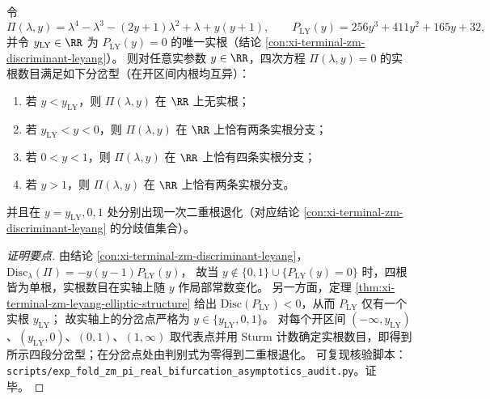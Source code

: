 \begin{conclusion}\label{con:xi-terminal-zm-pi-real-root-bifurcation}
令
\[
\Pi(\lambda,y)=\lambda^4-\lambda^3-(2y+1)\lambda^2+\lambda+y(y+1),
\qquad
P_{\mathrm{LY}}(y)=256y^3+411y^2+165y+32,
\]
并令 \(y_{\mathrm{LY}}\in\RR\) 为 \(P_{\mathrm{LY}}(y)=0\) 的唯一实根（结论 \ref{con:xi-terminal-zm-discriminant-leyang}）。
则对任意实参数 \(y\in\RR\)，四次方程 \(\Pi(\lambda,y)=0\) 的实根数目满足如下分岔型（在开区间内根均互异）：
\begin{enumerate}
  \item 若 \(y<y_{\mathrm{LY}}\)，则 \(\Pi(\lambda,y)\) 在 \(\RR\) 上无实根；
  \item 若 \(y_{\mathrm{LY}}<y<0\)，则 \(\Pi(\lambda,y)\) 在 \(\RR\) 上恰有两条实根分支；
  \item 若 \(0<y<1\)，则 \(\Pi(\lambda,y)\) 在 \(\RR\) 上恰有四条实根分支；
  \item 若 \(y>1\)，则 \(\Pi(\lambda,y)\) 在 \(\RR\) 上恰有两条实根分支。
\end{enumerate}
并且在 \(y=y_{\mathrm{LY}},0,1\) 处分别出现一次二重根退化（对应结论 \ref{con:xi-terminal-zm-discriminant-leyang} 的分歧值集合）。
\end{conclusion}
\begin{proof}[证明要点]
由结论 \ref{con:xi-terminal-zm-discriminant-leyang}，
\(\mathrm{Disc}_{\lambda}(\Pi)=-y(y-1)P_{\mathrm{LY}}(y)\)，
故当 \(y\notin\{0,1\}\cup\{P_{\mathrm{LY}}(y)=0\}\) 时，四根皆为单根，实根数目在实轴上随 \(y\) 作局部常数变化。
另一方面，定理 \ref{thm:xi-terminal-zm-leyang-elliptic-structure} 给出 \(\mathrm{Disc}(P_{\mathrm{LY}})<0\)，从而 \(P_{\mathrm{LY}}\) 仅有一个实根 \(y_{\mathrm{LY}}\)；
故实轴上的分岔点严格为 \(y\in\{y_{\mathrm{LY}},0,1\}\)。
对每个开区间 \((-\infty,y_{\mathrm{LY}})\)、\((y_{\mathrm{LY}},0)\)、\((0,1)\)、\((1,\infty)\) 取代表点并用 Sturm 计数确定实根数目，即得到所示四段分岔型；在分岔点处由判别式为零得到二重根退化。
可复现核验脚本：\texttt{scripts/exp\_fold\_zm\_pi\_real\_bifurcation\_asymptotics\_audit.py}。证毕。
\end{proof}

